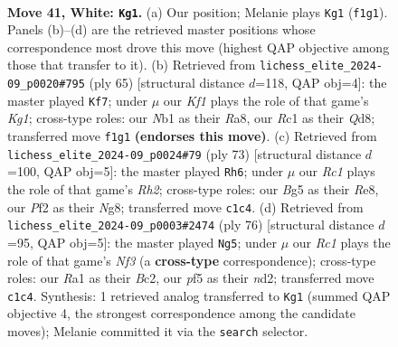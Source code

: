 \documentclass[11pt]{article}
\begin{document}
\clearpage

\begin{figure}[p]\centering
\begin{subfigure}{0.46\textwidth}\centering
\resizebox{\linewidth}{!}{%
\newchessgame
\chessboard[
  setfen={r3k3/6bp/bq2p3/p2p1pB1/P2p1Q1P/5N2/1n3P2/RNR2K2 w - - 2 41},
  showmover=false,
  pgfstyle=straightmove, color=movearrow, markmove={f1-g1}
]}
\caption{}
\end{subfigure}\hfill
\begin{subfigure}{0.46\textwidth}\centering
\resizebox{\linewidth}{!}{%
\newchessgame
\chessboard[
  setfen={r2q2k1/pp1n4/2pP1pb1/3pr3/6P1/1PQP1B1N/P4P2/B4R1K b - - 4 33},
  showmover=false,
  pgfstyle=straightmove, color=movearrow, markmove={g8-f7}
]}
\caption{}
\end{subfigure}
\\[4pt]
\begin{subfigure}{0.46\textwidth}\centering
\resizebox{\linewidth}{!}{%
\newchessgame
\chessboard[
  setfen={3qr1nk/ppp4r/5p2/3P1B2/3P4/5QNP/PP3PP1/2R3K1 b - - 14 37},
  showmover=false,
  pgfstyle=straightmove, color=movearrow, markmove={h7-h6}
]}
\caption{}
\end{subfigure}\hfill
\begin{subfigure}{0.46\textwidth}\centering
\resizebox{\linewidth}{!}{%
\newchessgame
\chessboard[
  setfen={2r1bbk1/3q3p/p3pBp1/4P3/7Q/2p2N1R/P1Bn1PP1/6K1 w - - 4 39},
  showmover=false,
  pgfstyle=straightmove, color=movearrow, markmove={f3-g5}
]}
\caption{}
\end{subfigure}
\caption{\textbf{Move 41, White: \texttt{Kg1}.} (a) Our position; Melanie plays \texttt{Kg1} (\texttt{f1g1}). Panels (b)--(d) are the retrieved master positions whose correspondence most drove this move (highest QAP objective among those that transfer to it). (b) Retrieved from \texttt{lichess\_elite\_2024-09\_p0020\#795} (ply 65) [structural distance $d$=118, QAP obj=4]: the master played \texttt{Kf7}; under $\mu$ our \emph{Kf1} plays the role of that game's \emph{Kg1}; cross-type roles: our \emph{N}b1 as their \emph{R}a8, our \emph{R}c1 as their \emph{Q}d8; transferred move \texttt{f1g1} \textbf{(endorses this move)}. (c) Retrieved from \texttt{lichess\_elite\_2024-09\_p0024\#79} (ply 73) [structural distance $d$=100, QAP obj=5]: the master played \texttt{Rh6}; under $\mu$ our \emph{Rc1} plays the role of that game's \emph{Rh2}; cross-type roles: our \emph{B}g5 as their \emph{R}e8, our \emph{P}f2 as their \emph{N}g8; transferred move \texttt{c1c4}. (d) Retrieved from \texttt{lichess\_elite\_2024-09\_p0003\#2474} (ply 76) [structural distance $d$=95, QAP obj=5]: the master played \texttt{Ng5}; under $\mu$ our \emph{Rc1} plays the role of that game's \emph{Nf3} (a \textbf{cross-type} correspondence); cross-type roles: our \emph{R}a1 as their \emph{B}c2, our \emph{p}f5 as their \emph{n}d2; transferred move \texttt{c1c4}. Synthesis: 1 retrieved analog transferred to \texttt{Kg1} (summed QAP objective 4, the strongest correspondence among the candidate moves); Melanie committed it via the \texttt{search} selector.}
\label{fig:thought-m80}
\end{figure}
\end{document}
